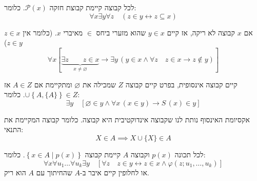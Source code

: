 \documentclass{tstextbook}
\begin{document}
\begin{definition}
לכל קבוצה קיימת קבוצת חזקה \(\mathcal{P}(x)\). כלומר:
$$\forall x\exists y\forall z\quad(z\in y\leftrightarrow z\subseteq x)$$

\end{definition}
\begin{definition}
אם \(x\) קבוצה לא ריקה, אז קיים \(y \in x\) שהוא מזערי ביחס \(\in\) מאיברי \(x\).
(כלומר אין \(z \in x\)\(z \in y\))
$$\forall x\left[\underbrace{\exists z\qquad z\in x}_{x\neq\varnothing}\rightarrow\exists y\,(y\in x\land\forall z\quad z\in x\rightarrow z\notin y)\right]$$

\end{definition}
\begin{definition}
קיים קבוצה אינסופית, בפרט קיים קבוצה \(Z\) שמכילה את \(\varnothing\) ומתקיימת אם \(A \in Z\) אז \(\cup \left\{  A,\{ A \}  \right\}\in Z\). כלומר:
$$\exists y\quad[\varnothing\in y\land\forall x\,(x\in y)\rightarrow S\,(x)\in y]$$

\end{definition}
\begin{remark}
אקסיומת האינסוף נותת לנו שקבוצה אינדוקטיבית היא קבוצה. כלומר קבוצה המקיימת את התנאי:
$$X \in A\implies X\cup \{ X \} \in A$$

\end{remark}
לכל תכונה \(p(x)\) וקבוצה \(A\) קיימת קבוצה \(\left\{  x \in A \mid p(x)  \right\}\). כלומר:
$$\forall x\forall u_{1}\ldots\forall u_{k}\exists y\quad\left[\forall z\quad z\in y\leftrightarrow z\in x\land\varphi\left(z;u_{1},\ldots,u_{k}\right)\right]$$
או לחלופין קיים איבר ב-\(A\) שהחיתוך עם \(A\) הוא ריק.
\end{document}
